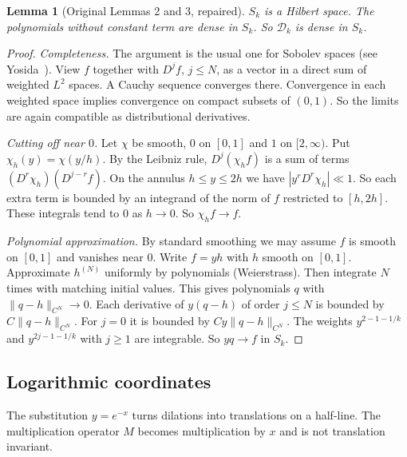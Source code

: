 \documentclass[12pt,letterpaper]{article}
\newtheorem{lemma}[theorem]{Lemma}
\theoremstyle{definition}
\theoremstyle{remark}
\newcommand{\Dk}{\mathcal{D}_k}
\begin{document}
\begin{lemma}[Original Lemmas 2 and 3, repaired]\label{lem:density}
$S_k$ is a Hilbert space. The polynomials without constant term are dense
in $S_k$. So $\Dk$ is dense in $S_k$.
\end{lemma}

\begin{proof}
\emph{Completeness.} The argument is the usual one for Sobolev spaces
(see Yosida~\cite{Yo74}). View $f$ together with $D^jf$, $j\le N$, as a vector
in a direct sum of weighted $L^2$ spaces. A Cauchy sequence converges
there. Convergence in each weighted space implies convergence on compact
subsets of $(0,1)$. So the limits are again compatible as distributional
derivatives.

\emph{Cutting off near $0$.} Let $\chi$ be smooth, $0$ on $[0,1]$ and $1$
on $[2,\infty)$. Put $\chi_h(y)=\chi(y/h)$. By the Leibniz rule,
$D^j(\chi_hf)$ is a sum of terms $(D^r\chi_h)(D^{j-r}f)$. On the annulus
$h\le y\le2h$ we have $|y^rD^r\chi_h|\ll1$. So each extra term is bounded
by an integrand of the norm of $f$ restricted to $[h,2h]$. These integrals
tend to $0$ as $h\to0$. So $\chi_hf\to f$.

\emph{Polynomial approximation.} By standard smoothing we may assume $f$
is smooth on $[0,1]$ and vanishes near $0$. Write $f=yh$ with $h$ smooth on
$[0,1]$. Approximate $h^{(N)}$ uniformly by polynomials (Weierstrass). Then
integrate $N$ times with matching initial values. This gives polynomials
$q$ with $\|q-h\|_{C^N}\to0$. Each derivative of $y(q-h)$ of order $j\le N$
is bounded by $C\|q-h\|_{C^N}$. For $j=0$ it is bounded by
$Cy\|q-h\|_{C^N}$. The weights $y^{2-1-1/k}$ and $y^{2j-1-1/k}$ with $j\ge1$
are integrable. So $yq\to f$ in $S_k$.
\end{proof}

\subsection{Logarithmic coordinates}

The substitution $y=e^{-x}$ turns dilations into translations on a half-line.
The multiplication operator $M$ becomes multiplication by $x$ and is not translation invariant.
\end{document}
